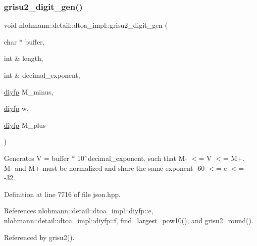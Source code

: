 \subsubsection{\texorpdfstring{grisu2\+\_\+digit\+\_\+gen()}{grisu2\_digit\_gen()}}
{\footnotesize\ttfamily void nlohmann\+::detail\+::dtoa\+\_\+impl\+::grisu2\+\_\+digit\+\_\+gen (\begin{DoxyParamCaption}\item[{char $\ast$}]{buffer,  }\item[{int \&}]{length,  }\item[{int \&}]{decimal\+\_\+exponent,  }\item[{\hyperlink{structnlohmann_1_1detail_1_1dtoa__impl_1_1diyfp}{diyfp}}]{M\+\_\+minus,  }\item[{\hyperlink{structnlohmann_1_1detail_1_1dtoa__impl_1_1diyfp}{diyfp}}]{w,  }\item[{\hyperlink{structnlohmann_1_1detail_1_1dtoa__impl_1_1diyfp}{diyfp}}]{M\+\_\+plus }\end{DoxyParamCaption})\hspace{0.3cm}{\ttfamily [inline]}}

Generates V = buffer $\ast$ 10$^\wedge$decimal\+\_\+exponent, such that M-\/ $<$= V $<$= M+. M-\/ and M+ must be normalized and share the same exponent -\/60 $<$= e $<$= -\/32. 

Definition at line 7716 of file json.\+hpp.



References nlohmann\+::detail\+::dtoa\+\_\+impl\+::diyfp\+::e, nlohmann\+::detail\+::dtoa\+\_\+impl\+::diyfp\+::f, find\+\_\+largest\+\_\+pow10(), and grisu2\+\_\+round().



Referenced by grisu2().


